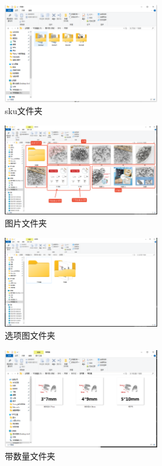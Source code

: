 \documentclass[UTF8]{ctexart}
\begin{document}
  \begin{figure}[H]
    \centering
    \includegraphics[width=0.6\textwidth]{image/image copy 2.png}
    \caption{sku文件夹}
  \end{figure}

  \begin{figure}[H]
    \centering
    \includegraphics[width=0.6\textwidth]{image/image copy 6.png}
    \caption{图片文件夹}
  \end{figure}

  \begin{figure}[H]
    \centering
    \includegraphics[width=0.6\textwidth]{image/image copy 7.png}
    \caption{选项图文件夹}
  \end{figure}

  \begin{figure}[H]
    \centering
    \includegraphics[width=0.6\textwidth]{image/image copy 5.png}
    \caption{带数量文件夹}
  \end{figure} 
\end{document}

